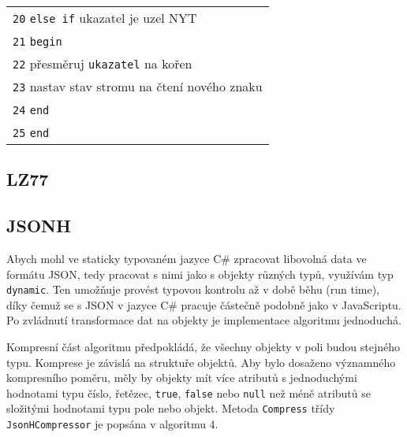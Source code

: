 \begin{table}[!h]
\begin{tabular}{|l|}
\texttt{20} \hspace*{5mm}\texttt{else if} ukazatel je uzel NYT\\
\texttt{21} \hspace*{5mm}\texttt{begin}\\
\texttt{22} \hspace*{10mm}přesměruj \texttt{ukazatel} na kořen\\
\texttt{23} \hspace*{10mm}nastav stav stromu na čtení nového znaku\\
\texttt{24} \hspace*{5mm}\texttt{end}\\
\texttt{25} \texttt{end}\\
\hline
\end{tabular}
\end{table}

\subsection{LZ77}

\subsection{JSONH}
Abych mohl ve staticky typovaném jazyce C\# zpracovat libovolná data ve formátu JSON, tedy pracovat s nimi jako s objekty různých typů, využívám typ \texttt{dynamic}. Ten umožňuje provést typovou kontrolu až v době běhu (run time), díky čemuž se s JSON v jazyce C\# pracuje částečně podobně jako v JavaScriptu. Po zvládnutí transformace dat na objekty je implementace algoritmu jednoduchá.

Kompresní část algoritmu předpokládá, že všechny objekty v poli budou stejného typu. Komprese je závislá na struktuře objektů. Aby bylo dosaženo významného kompresního poměru, měly by objekty mít více atributů s jednoduchými hodnotami typu číslo, řetězec, \texttt{true}, \texttt{false} nebo \texttt{null} než méně atributů se složitými hodnotami typu pole nebo objekt. Metoda \texttt{Compress} třídy \texttt{JsonHCompressor} je popsána v algoritmu 4.

